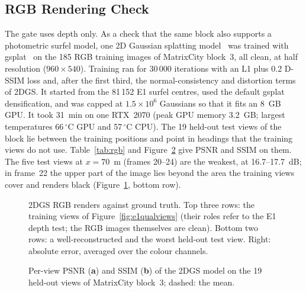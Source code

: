 \subsection{RGB Rendering Check}
\label{sup:rgb}
The gate uses depth only. As a check that the same block also supports a photometric surfel model, one
2D Gaussian splatting model~\cite{gs_2dgs} was trained with gsplat~\cite{gs_gsplat} on the 185 RGB training images of
MatrixCity block~3, all clean, at half resolution ($960\times540$). Training ran for 30\,000 iterations with an
L1 plus 0.2 D-SSIM loss and, after the first third, the normal-consistency and distortion terms of 2DGS. It
started from the 81\,152 E1 surfel centres, used the default gsplat densification, and was capped at
$1.5\times10^{6}$ Gaussians so that it fits an 8~GB GPU. It took 31~min on one RTX~2070 (peak GPU memory
3.2~GB; largest temperatures 66\,$^{\circ}$C GPU and 57\,$^{\circ}$C CPU). The 19 held-out test views of the
block lie between the training positions and point in headings that the training views do not use.
Table~\ref{tab:rgb} and Figure~\ref{fig:rgbtest} give PSNR and SSIM on them. The five test views at
$x=70$~m (frames 20--24) are the weakest, at 16.7--17.7~dB; in frame~22 the upper part of the image
lies beyond the area the training views cover and renders black (Figure~\ref{fig:rgbviews}, bottom row).

\begin{table}[!htbp]
\centering
\caption{2DGS RGB reconstruction of MatrixCity block~3: test-split mean $\pm$ standard deviation over
views, and the three training views of Figure~\ref{fig:e1qualviews}.}
\label{tab:rgb}

\end{table}

\begin{figure}[!htbp]
\centering

\caption{2DGS RGB renders against ground truth. Top three rows: the training views of
Figure~\ref{fig:e1qualviews} (their roles refer to the E1 depth test; the RGB images themselves are clean).
Bottom two rows: a well-reconstructed and the worst held-out test view. Right: absolute error, averaged over
the colour channels.}
\label{fig:rgbviews}
\end{figure}

\begin{figure}[!htbp]
\centering

\caption{Per-view PSNR (\textbf{a}) and SSIM (\textbf{b}) of the 2DGS model on the 19 held-out views of
MatrixCity block~3; dashed: the mean.}
\label{fig:rgbtest}
\end{figure}
\FloatBarrier

